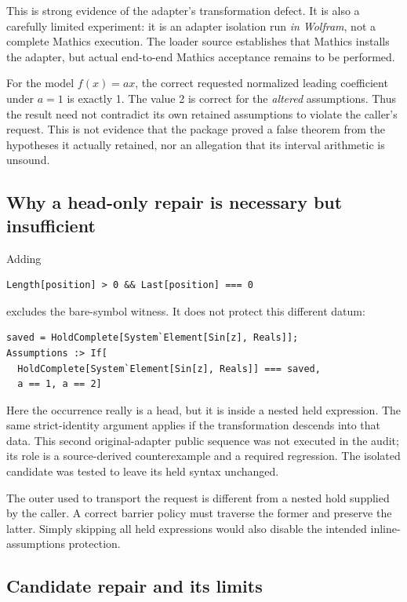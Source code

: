 \documentclass[11pt,letterpaper]{article}
\newcommand{\code}[1]{\texttt{\detokenize{#1}}}
\begin{document}
This is strong evidence of the adapter's transformation defect. It is also a
carefully limited experiment: it is an adapter isolation run \emph{in Wolfram},
not a complete Mathics execution. The loader source establishes that Mathics
installs the adapter, but actual end-to-end Mathics acceptance remains to be
performed.

For the model $f(x)=a x$, the correct requested normalized leading coefficient
under $a=1$ is exactly 1. The value 2 is correct for the \emph{altered}
assumptions. Thus the result need not contradict its own retained assumptions
to violate the caller's request. This is not evidence that the package proved
a false theorem from the hypotheses it actually retained, nor an allegation
that its interval arithmetic is unsound.

\subsection{Why a head-only repair is necessary but insufficient}

Adding
\begin{lstlisting}
Length[position] > 0 && Last[position] === 0
\end{lstlisting}
excludes the bare-symbol witness. It does not protect this different datum:
\begin{lstlisting}
saved = HoldComplete[System`Element[Sin[z], Reals]];
Assumptions :> If[
  HoldComplete[System`Element[Sin[z], Reals]] === saved,
  a == 1, a == 2]
\end{lstlisting}
Here the occurrence really is a head, but it is inside a nested held expression.
The same strict-identity argument applies if the transformation descends into
that data. This second original-adapter public sequence was not executed in
the audit; its role is a source-derived counterexample and a required
regression. The isolated candidate was tested to leave its held syntax
unchanged.

The outer \code{HoldComplete} used to transport the request is different from a
nested hold supplied by the caller. A correct barrier policy must traverse the
former and preserve the latter. Simply skipping all held expressions would
also disable the intended inline-assumptions protection.

\subsection{Candidate repair and its limits}
\end{document}
